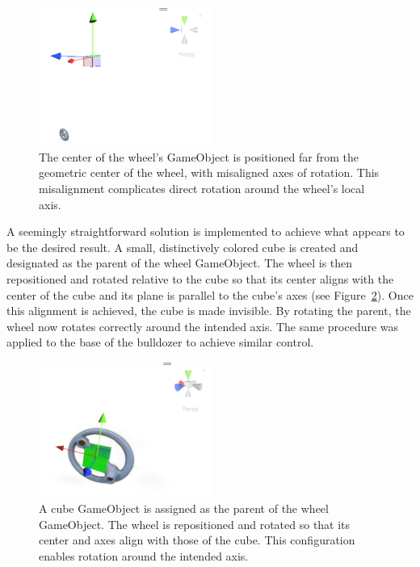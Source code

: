 \documentclass[12pt]{article}
\begin{document}
\begin{figure}[h!]
	\centering
	\includegraphics[width=0.5\textwidth]{Images/wheel_center.png}
	\caption{The center of the wheel’s GameObject is positioned far from the geometric center of the wheel, with misaligned axes of rotation. This misalignment complicates direct rotation around the wheel’s local axis.}
	\label{fig:wheel_center}
\end{figure}
\FloatBarrier
\noindent
A seemingly straightforward solution is implemented to achieve what appears to be the desired result. A small, distinctively colored cube is created and designated as the parent of the wheel GameObject. The wheel is then repositioned and rotated relative to the cube so that its center aligns with the center of the cube and its plane is parallel to the cube’s axes (see Figure~\ref{fig:wheel_cube}). Once this alignment is achieved, the cube is made invisible. By rotating the parent, the wheel now rotates correctly around the intended axis. The same procedure was applied to the base of the bulldozer to achieve similar control.
\begin{figure}[h!]
	\centering
	\includegraphics[width=0.5\textwidth]{Images/wheel_cube.png}
	\caption{A cube GameObject is assigned as the parent of the wheel GameObject. The wheel is repositioned and rotated so that its center and axes align with those of the cube. This configuration enables rotation around the intended axis.}
	\label{fig:wheel_cube}
\end{figure}
\end{document}
